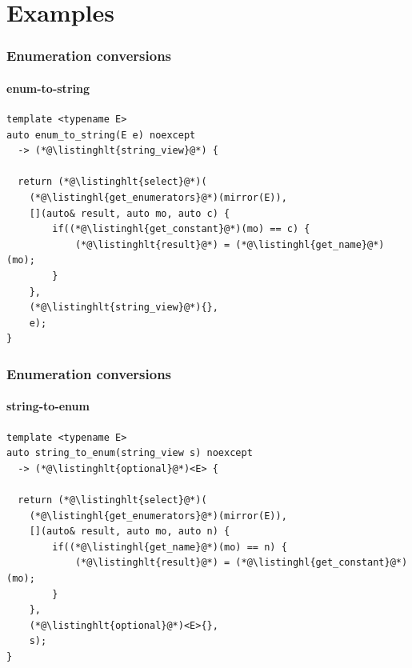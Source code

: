 \documentclass[compress,table,xcolor=table]{beamer}
\begin{document}
\section{Examples}
\begin{frame}[fragile]
  \frametitle{Enumeration conversions}
  \framesubtitle{enum-to-string}
  \begin{lstlisting}[language=c++2x]
template <typename E>
auto enum_to_string(E e) noexcept
  -> (*@\listinghlt{string_view}@*) {

  return (*@\listinghlt{select}@*)(
    (*@\listinghl{get_enumerators}@*)(mirror(E)),
    [](auto& result, auto mo, auto c) {
        if((*@\listinghl{get_constant}@*)(mo) == c) {
            (*@\listinghlt{result}@*) = (*@\listinghl{get_name}@*)(mo);
        }
    },
    (*@\listinghlt{string_view}@*){},
    e);
}
  \end{lstlisting}
\end{frame}
\begin{frame}[fragile]
  \frametitle{Enumeration conversions}
  \framesubtitle{string-to-enum}
  \begin{lstlisting}[language=c++2x]
template <typename E>
auto string_to_enum(string_view s) noexcept
  -> (*@\listinghlt{optional}@*)<E> {

  return (*@\listinghlt{select}@*)(
    (*@\listinghl{get_enumerators}@*)(mirror(E)),
    [](auto& result, auto mo, auto n) {
        if((*@\listinghl{get_name}@*)(mo) == n) {
            (*@\listinghlt{result}@*) = (*@\listinghl{get_constant}@*)(mo);
        }
    },
    (*@\listinghlt{optional}@*)<E>{},
    s);
}
  \end{lstlisting}
\end{frame}
\end{document}
